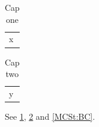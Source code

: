 \documentclass{article}
\def\FloatPre{MCS}\newcommand{\ltbcp}{A}
\begin{document}
\begin{longtable}{l}
\caption{Cap one\label{\FloatPre t:\ltbcp}}\\
x\\
\end{longtable}
\renewcommand{\ltbcp}{B}
\begin{longtable}{l}
\caption{Cap two\label{\FloatPre t:\ltbcp}}\\
y\\
\end{longtable}
\begin{table}\caption{Cap three\label{\FloatPre t:\ltbcp C}}\end{table}
See \ref{MCSt:A}, \ref{MCSt:B} and \ref{MCSt:BC}.
\end{document}
